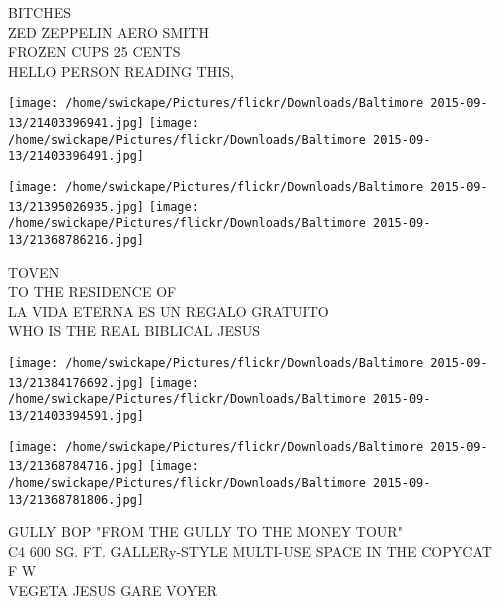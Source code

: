 \documentclass[10pt,letterpaper]{article}
\begin{document}
BITCHES\\
ZED ZEPPELIN AERO SMITH\\
FROZEN CUPS 25 CENTS\\
HELLO PERSON READING THIS,\\
\pagebreak

\texttt{[image: /home/swickape/Pictures/flickr/Downloads/Baltimore 2015-09-13/21403396941.jpg]}
\texttt{[image: /home/swickape/Pictures/flickr/Downloads/Baltimore 2015-09-13/21403396491.jpg]}

\texttt{[image: /home/swickape/Pictures/flickr/Downloads/Baltimore 2015-09-13/21395026935.jpg]}
\texttt{[image: /home/swickape/Pictures/flickr/Downloads/Baltimore 2015-09-13/21368786216.jpg]}

TOVEN\\
TO THE RESIDENCE OF\\
LA VIDA ETERNA ES UN REGALO GRATUITO\\
WHO IS THE REAL BIBLICAL JESUS\\
\pagebreak

\texttt{[image: /home/swickape/Pictures/flickr/Downloads/Baltimore 2015-09-13/21384176692.jpg]}
\texttt{[image: /home/swickape/Pictures/flickr/Downloads/Baltimore 2015-09-13/21403394591.jpg]}

\texttt{[image: /home/swickape/Pictures/flickr/Downloads/Baltimore 2015-09-13/21368784716.jpg]}
\texttt{[image: /home/swickape/Pictures/flickr/Downloads/Baltimore 2015-09-13/21368781806.jpg]}

GULLY BOP "FROM THE GULLY TO THE MONEY TOUR"\\
C4 600 SG. FT. GALLERy{-}STYLE MULTI{-}USE SPACE IN THE COPYCAT\\
F W\\
VEGETA JESUS GARE VOYER\\
\pagebreak
\end{document}
